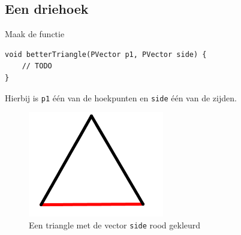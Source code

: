 \documentclass{../qh_exercise}
\begin{document}
\subsection{Een driehoek}
Maak de functie
\begin{lstlisting}
void betterTriangle(PVector p1, PVector side) {
    // TODO
}
\end{lstlisting}
Hierbij is \texttt{p1} \'e\'en van de hoekpunten en \texttt{side} \'e\'en van de zijden.
\begin{figure}[H]
	\centering
	\includegraphics[width=\textwidth/4]{triangle.png}
	\caption{Een triangle met de vector \texttt{side} rood gekleurd}
	\label{fig:triangle}
\end{figure}
\end{document}
